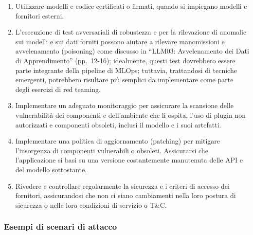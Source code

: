 \documentclass[
]{article}
\begin{document}
\begin{enumerate}
\item
  Utilizzare modelli e codice certificati o firmati, quando si impiegano
  modelli e fornitori esterni.
\item
  L'esecuzione di test avversariali di robustezza e per la rilevazione
  di anomalie sui modelli e sui dati forniti possono aiutare a rilevare
  manomissioni e avvelenamento (poisoning) come discusso in ``LLM03:
  Avvelenamento dei Dati di Apprendimento'' (pp.~12-16); idealmente,
  questi test dovrebbero essere parte integrante della pipeline di
  MLOps; tuttavia, trattandosi di tecniche emergenti, potrebbero
  risultare più semplici da implementare come parte degli esercizi di
  red teaming.
\item
  Implementare un adeguato monitoraggio per assicurare la scansione
  delle vulnerabilità dei componenti e dell'ambiente che li ospita,
  l'uso di plugin non autorizzati e componenti obsoleti, inclusi il
  modello e i suoi artefatti.
\item
  Implementare una politica di aggiornamento (patching) per mitigare
  l'insorgenza di componenti vulnerabili o obsoleti. Assicurarsi che
  l'applicazione si basi su una versione costantemente manutenuta delle
  API e del modello sottostante.
\item
  Rivedere e controllare regolarmente la sicurezza e i criteri di
  accesso dei fornitori, assicurandosi che non ci siano cambiamenti
  nella loro postura di sicurezza o nelle loro condizioni di servizio o
  T\&C.
\end{enumerate}

\subsubsection{Esempi di scenari di
attacco}\label{esempi-di-scenari-di-attacco}
\end{document}
